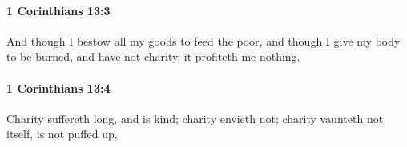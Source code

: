 		\paragraph{1 Corinthians 13:3} %
			\label{1CORINTHIANS-13-3}

			And though I bestow all my goods to feed the poor, and though I give my body to be burned, and have not charity, it profiteth me nothing.

			\begin{framed}
				\scriptsize
				\begin{compactdesc}
					\item[SBLG] 
				\end{compactdesc}
			\end{framed}

		\paragraph{1 Corinthians 13:4} %
			\label{1CORINTHIANS-13-4}

			Charity suffereth long, and is kind; charity envieth not; charity vaunteth not itself, is not puffed up,

